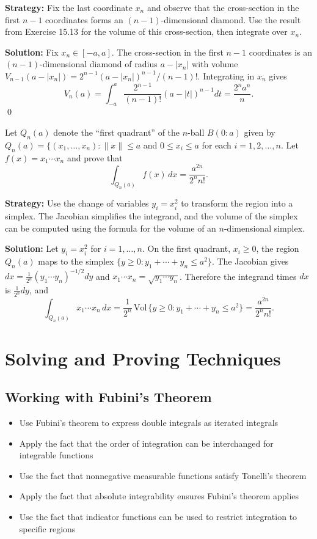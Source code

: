 \noindent\textbf{Strategy:} Fix the last coordinate \(x_n\) and observe that the cross-section in the first \(n-1\) coordinates forms an \((n-1)\)-dimensional diamond. Use the result from Exercise 15.13 for the volume of this cross-section, then integrate over \(x_n\).

\bigskip\noindent\textbf{Solution:}
Fix \(x_n\in[-a,a]\). The cross-section in the first \(n-1\) coordinates is an \((n-1)\)-dimensional diamond of radius \(a-|x_n|\) with volume \(V_{n-1}(a-|x_n|)=2^{n-1}(a-|x_n|)^{n-1}/(n-1)!\). Integrating in \(x_n\) gives
\[
V_n(a)=\int_{-a}^{a} \frac{2^{n-1}}{(n-1)!} (a-|t|)^{n-1} dt = \frac{2^n a^n}{n}.
\]\qed


\begin{problembox}
Let \( Q_n(a) \) denote the ``first quadrant'' of the \( n \)-ball \( B(0:a) \) given by
$Q_n(a) = \{(x_1, \ldots, x_n): \|x\| \leq a$ and $ 0 \leq x_i \leq a $ for each $ i = 1, 2, \ldots, n.$
Let \( f(x) = x_1 \cdots x_n \) and prove that
\[
\int_{Q_n(a)} f(x) \, dx = \frac{a^{2n}}{2^n n!}.
\]
\end{problembox}

\noindent\textbf{Strategy:} Use the change of variables \(y_i = x_i^2\) to transform the region into a simplex. The Jacobian simplifies the integrand, and the volume of the simplex can be computed using the formula for the volume of an \(n\)-dimensional simplex.

\bigskip\noindent\textbf{Solution:}
Let \(y_i=x_i^2\) for \(i=1,\ldots,n\). On the first quadrant, \(x_i\ge 0\), the region \(Q_n(a)\) maps to the simplex \(\{y\ge 0: y_1+\cdots+y_n\le a^2\}\). The Jacobian gives \(dx=\frac{1}{2^n}(y_1\cdots y_n)^{-1/2}dy\) and \(x_1\cdots x_n=\sqrt{y_1\cdots y_n}\). Therefore the integrand times \(dx\) is \(\frac{1}{2^n} dy\), and
\[
\int_{Q_n(a)} x_1\cdots x_n\,dx = \frac{1}{2^n}\,\mathrm{Vol}\,\{y\ge 0: y_1+\cdots+y_n\le a^2\} = \frac{a^{2n}}{2^n n!}.
\]

\section{Solving and Proving Techniques}

\subsection*{Working with Fubini's Theorem}
\begin{itemize}
\item Use Fubini's theorem to express double integrals as iterated integrals
\item Apply the fact that the order of integration can be interchanged for integrable functions
\item Use the fact that nonnegative measurable functions satisfy Tonelli's theorem
\item Apply the fact that absolute integrability ensures Fubini's theorem applies
\item Use the fact that indicator functions can be used to restrict integration to specific regions
\end{itemize}

